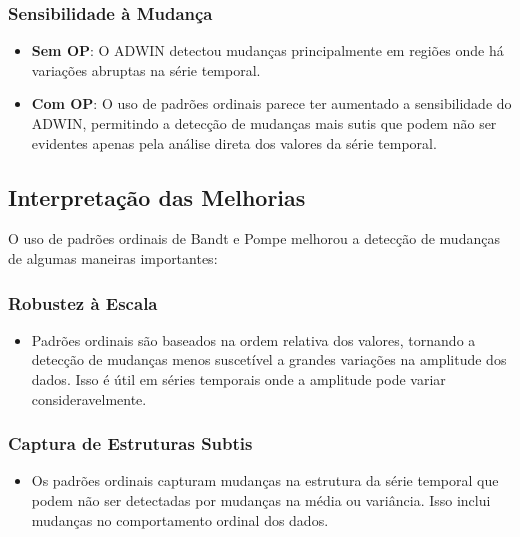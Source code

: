 \documentclass[
]{article}
\providecommand{\tightlist}{%
  \setlength{\itemsep}{0pt}\setlength{\parskip}{0pt}}
\begin{document}
\hypertarget{sensibilidade-uxe0-mudanuxe7a-1}{%
\subsubsection{Sensibilidade à
Mudança}\label{sensibilidade-uxe0-mudanuxe7a-1}}

\begin{itemize}
\item
  \textbf{Sem OP}: O ADWIN detectou mudanças principalmente em regiões
  onde há variações abruptas na série temporal.
\item
  \textbf{Com OP}: O uso de padrões ordinais parece ter aumentado a
  sensibilidade do ADWIN, permitindo a detecção de mudanças mais sutis
  que podem não ser evidentes apenas pela análise direta dos valores da
  série temporal.
\end{itemize}

\hypertarget{interpretauxe7uxe3o-das-melhorias}{%
\subsection{Interpretação das
Melhorias}\label{interpretauxe7uxe3o-das-melhorias}}

O uso de padrões ordinais de Bandt e Pompe melhorou a detecção de
mudanças de algumas maneiras importantes:

\hypertarget{robustez-uxe0-escala}{%
\subsubsection{Robustez à Escala}\label{robustez-uxe0-escala}}

\begin{itemize}
\tightlist
\item
  Padrões ordinais são baseados na ordem relativa dos valores, tornando
  a detecção de mudanças menos suscetível a grandes variações na
  amplitude dos dados. Isso é útil em séries temporais onde a amplitude
  pode variar consideravelmente.
\end{itemize}

\hypertarget{captura-de-estruturas-subtis}{%
\subsubsection{Captura de Estruturas
Subtis}\label{captura-de-estruturas-subtis}}

\begin{itemize}
\tightlist
\item
  Os padrões ordinais capturam mudanças na estrutura da série temporal
  que podem não ser detectadas por mudanças na média ou variância. Isso
  inclui mudanças no comportamento ordinal dos dados.
\end{itemize}
\end{document}
